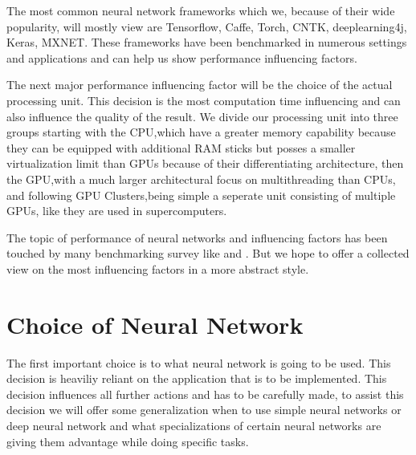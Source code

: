 \documentclass[conference]{IEEEtran}
\begin{document}


The most common neural network frameworks which we, because of their wide popularity, will mostly view are Tensorflow\cite{abadi2016tensorflow}, Caffe\cite{jia2014caffe}, Torch\cite{collobert2002torch}, CNTK\cite{gitcntk}, deeplearning4j\cite{websitedl4j}, Keras\cite{websitekeras}, MXNET\cite{websitemxnet}. These frameworks have been benchmarked in numerous settings and applications and can help us show performance influencing factors.



The next major performance influencing factor will be the choice of the actual processing unit. This decision is the most computation time influencing and can also influence the quality of the result. We divide our processing unit into three groups starting with the CPU,which have a greater memory capability because they can be equipped with additional RAM sticks but posses a smaller virtualization limit than GPUs because of their differentiating architecture, then the GPU,with a much larger architectural focus on multithreading than CPUs, and following GPU Clusters,being simple a seperate unit consisting of multiple GPUs, like they are used in supercomputers.




The topic of performance of neural networks and influencing factors has been touched by many benchmarking survey like \cite{shi2016benchmarking} and \cite{qi2016paleo}.	 But we hope to offer a collected view on the most influencing factors in a more abstract style.




\section{Choice of Neural Network}	

The first important choice is to what neural network is going to be used. This decision is heaviliy reliant on the application that is to be implemented. This decision influences all further actions and has to be carefully made, to assist this decision we will offer some generalization when to use simple neural networks or deep neural network and what specializations of certain neural networks are giving them advantage while doing specific tasks.
\end{document}
